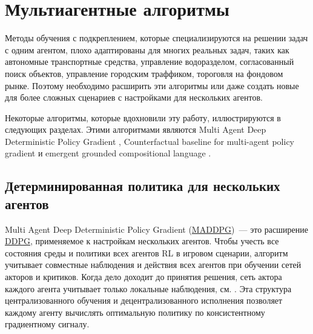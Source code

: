 \section{Мультиагентные алгоритмы} \label{ch2:ma-algs} %

Методы обучения с подкреплением, которые специализируются на решении задач с одним агентом, плохо адаптированы для многих реальных задач, таких как автономные транспортные средства, управление водоразделом, согласованный поиск объектов, управление городским траффиком, тороговля на фондовом рынке. Поэтому необходимо расширить эти алгоритмы или даже создать новые для более сложных сценариев с настройками для нескольких агентов.

Некоторые алгоритмы, которые вдохновили эту работу, иллюстрируются в следующих разделах. Этими алгоритмами являются Multi Agent Deep Deterministic Policy Gradient \cite{lowe2017multiagent}, Counterfactual baseline for multi-agent policy gradient \cite{foerster2017counterfactual} и emergent grounded compositional language \cite{mordatch2017emergence}.

\subsection{Детерминированная политика для нескольких агентов}

Multi Agent Deep Deterministic Policy Gradient (\hyperref[acr:maddpg]{MADDPG})~--- это расширение \hyperref[acr:ddpg]{DDPG}, применяемое к настройкам нескольких агентов. Чтобы учесть все состояния среды и политики всех агентов RL в игровом сценарии, алгоритм учитывает совместные наблюдения и действия всех агентов при обучении сетей акторов и критиков. Когда дело доходит до принятия решения, сеть актора каждого агента учитывает только локальные наблюдения, см. . Эта структура централизованного обучения и децентрализованного исполнения позволяет каждому агенту вычислять оптимальную политику по консистентному градиентному сигналу. \cite{lowe2017multiagent}

